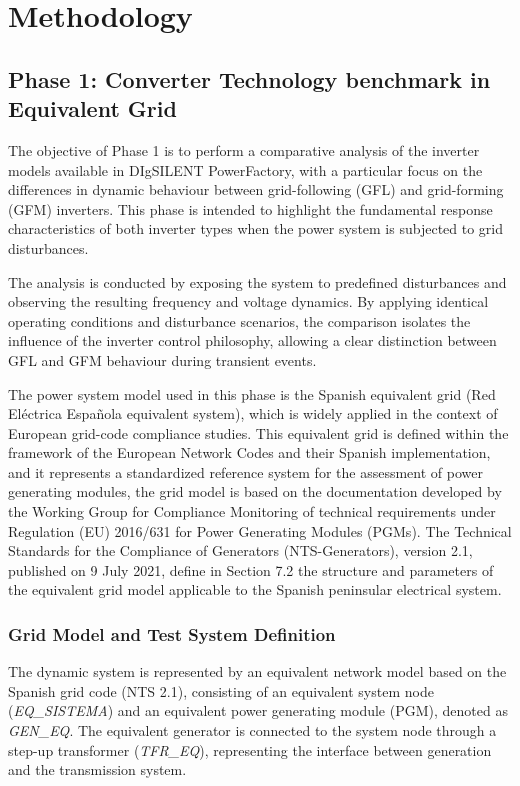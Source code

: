 \chapter{Methodology}
\label{ch:Methodology}

\section{Phase 1: Converter Technology benchmark in Equivalent Grid}
The objective of Phase 1 is to perform a comparative analysis of the inverter models available in DIgSILENT PowerFactory, with a particular focus on the differences in dynamic behaviour between grid-following (GFL) and grid-forming (GFM) inverters. This phase is intended to highlight the fundamental response characteristics of both inverter types when the power system is subjected to grid disturbances.

The analysis is conducted by exposing the system to predefined disturbances and observing the resulting frequency and voltage dynamics. By applying identical operating conditions and disturbance scenarios, the comparison isolates the influence of the inverter control philosophy, allowing a clear distinction between GFL and GFM behaviour during transient events.

The power system model used in this phase is the Spanish equivalent grid (Red Eléctrica Española equivalent system), which is widely applied in the context of European grid-code compliance studies. This equivalent grid is defined within the framework of the European Network Codes and their Spanish implementation, and it represents a standardized reference system for the assessment of power generating modules, the grid model is based on the documentation developed by the Working Group for Compliance Monitoring of technical requirements under Regulation (EU) 2016/631 for Power Generating Modules (PGMs). The Technical Standards for the Compliance of Generators (NTS-Generators), version 2.1, published on 9 July 2021, define in Section 7.2 the structure and parameters of the equivalent grid model applicable to the Spanish peninsular electrical system.

\subsection{Grid Model and Test System Definition}

The dynamic system is represented by an equivalent network model based on the Spanish grid code (NTS 2.1), consisting of an equivalent system node (\textit{EQ\_SISTEMA}) and an equivalent power generating module (PGM), denoted as \textit{GEN\_EQ}. The equivalent generator is connected to the system node through a step-up transformer (\textit{TFR\_EQ}), representing the interface between generation and the transmission system.

